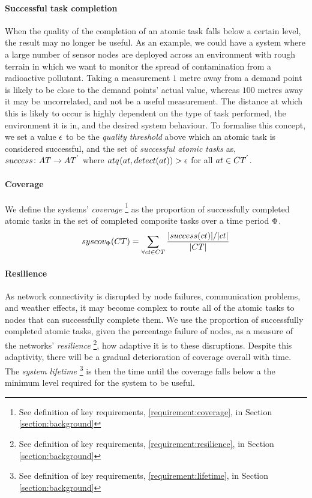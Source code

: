 \paragraph{Successful task completion}
\label{section:success}
When the quality of the completion of an atomic task falls below a certain level, the result may no longer be useful. As an example, we could have a system where a large number of sensor nodes are deployed across an environment with rough terrain in which we want to monitor the spread of contamination from a radioactive pollutant. Taking a measurement $1$ metre away from a demand point is likely to be close to the demand points' actual value, whereas $100$ metres away it may be uncorrelated, and not be a useful measurement. The distance at which this is likely to occur is highly dependent on the type of task performed, the environment it is in, and the desired system behaviour. To formalise this concept, we set a value $\epsilon$ to be the \textit{quality threshold} above which an atomic task is considered successful, and the set of \textit{successful atomic tasks} as, $\formalTasksSuccess{}{}$ where $\functionAtomicTaskQualitySensor{}{} > \varQualityMin{}{}$ for all $\varAtomicTask{}{} \in \setCompositeTask{}{'}$. 

\paragraph{Coverage}
\label{section:coverage}
We define the systems' \textit{ coverage} \footnote{See definition of key requirements, \ref{requirement:coverage}, in Section \ref{section:background}} as the proportion of successfully completed atomic tasks in the set of completed composite tasks over a time period $\Phi$.
\begin{equation}
	\label{eq:coverage}
	\functionSystemCoverage{}{} = \sum\limits_{\forall \varCompositeTask{}{} \in \setCompositeTask{}{}} 
	\frac
	{\funcSize{\functionTasksSuccess{\varCompositeTask{}{}}{}}/\funcSize{\varCompositeTask{}{}}}
	{\funcSize{\setCompositeTask{}{}}{}}
\end{equation}

\paragraph{Resilience}
\label{section:resilience}
As network connectivity is disrupted by node failures, communication problems, and weather effects, it may become complex to route all of the atomic tasks to nodes that can successfully complete them. We use the proportion of successfully completed atomic tasks, given the percentage failure of nodes, as a measure of the networks' \textit{resilience} \footnote{See definition of key requirements, \ref{requirement:resilience}, in Section \ref{section:background}}, how adaptive it is to these disruptions. Despite this adaptivity, there will be a gradual deterioration of coverage overall with time. The \textit{system lifetime} \footnote{See definition of key requirements, \ref{requirement:lifetime}, in Section \ref{section:background}} is then the time until the coverage falls below a the minimum level required for the system to be useful. 
